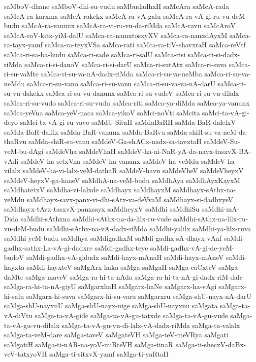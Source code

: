 {saMboV-dhane
saMboV-dhi-su-vudu
saMbudadhxH
saMcAra
saMcA-rada
saMcA-ra-karxma
saMcA-rakekx
saMcA-ra-vA-galu
saMcA-ra-vA-gi-ru-vu-deM-budu
saMcA-ra-vanunx
saMcA-ra-vi-ru-vu-da-riMda
saMcA-ravu
saMcAroV
saMcA-roV-kitx-yiM-dalU
saMca-ra-namxtosxyXV
saMca-ra-nanxdAyxM
saMca-ra-tayx-yamf
saMca-ra-teyxVSa
saMca-rati
saMca-ra-tiV-shavxraH
saMca-reVtf
saMca-ri-sa-ba-hudu
saMca-ri-sade
saMca-ri-salU
saMca-risi
saMca-ri-si-dadx-riMda
saMca-ri-si-danoV
saMca-ri-si-darU
saMca-ri-sutAtx
saMca-ri-suva
saMca-ri-su-vaMte
saMca-ri-su-va-nA-dadx-riMda
saMca-ri-su-va-neMba
saMca-ri-su-va-neMdu
saMca-ri-su-vano
saMca-ri-su-vanu
saMca-ri-su-va-va-nA-darU
saMca-ri-su-vu-dakekx
saMca-ri-su-vu-danunx
saMca-ri-su-vudeV
saMca-ri-su-vu-dilalx
saMca-ri-su-vudo
saMca-ri-su-vudu
saMca-riti
saMca-ya-diMda
saMca-ya-vanunx
saMca-yeVna
saMca-yeV-naca
saMca-yikoV
saMci-noVti
saMcita
saMci-ta-vA-gi-deyo
saMci-ta-vA-gi-ru-vavo
saMdU-SitaH
saMdaBaRH
saMda-BaR-dalelxV
saMda-BaR-dalilx
saMda-BaR-vanunx
saMda-BaRvu
saMda-shiR-su-va-neM-da-thaRvu
saMda-shiR-su-vanu
saMdeV-Ga-shACx-nadx-sa-tavxtaH
saMdeV-Su-veM-bu-dAgi
saMdeVha
saMdeVhaH
saMdeV-ha-ni-NaR-yA-da-nayx-tasxvX-BA-vAdi
saMdeV-ha-setxVna
saMdeV-ha-vanunx
saMdeV-ha-veMdu
saMdeV-ha-vilalx
saMdeV-ha-vi-lalx-veM-dathaR
saMdeV-havu
saMdeVheV
saMdeVheyxV
saMdeV-heyxV-ga-haneV
saMdhA-na-veM-budu
saMdhAya
saMdhAyxKayxM
saMdhatetxV
saMdha-vi-lalxde
saMdhayx
saMdhayxM
saMdhayx-sAthx-na-veMdu
saMdhayx-savx-panx-vi-dhi-sAtx-va-deVvaM
saMdhayx-si-dadhxyeV
saMdhayx-tAvx-tasxvX-panxsayx
saMdheyxV
saMdhi
saMdhiSu
saMdhi-mA-Dida
saMdhi-sAthxna
saMdhi-sAthx-na-da-lilx-ru-vude
saMdhi-sAthx-na-lilx-ru-vu-deM-budu
saMdhi-sAthx-na-vA-dadx-riMda
saMdhi-yalilx
saMdhi-ya-lilx-ruva
saMdhi-yeM-budu
saMdhya
saMdigadhxM
saMdi-gadhx-sA-dhayx-vAnf
saMdi-gadhx-sathx-La-vA-gi-dadxre
saMdi-gadhx-teye
saMdi-gadhx-vA-gi-de-yeM-budoV
saMdi-gadhx-vA-gidudx
saMdi-hayx-mAnaH
saMdi-hayx-mAneV
saMdi-hayxta
saMdi-hayxteV
saMgArx-haka
saMga
saMgaH
saMga-caCxteV
saMga-daMte
saMga-maveV
saMga-ra-hi-ta-nAda
saMga-ra-hi-ta-nA-gi-dadx-riM-dale
saMga-ra-hi-ta-nA-giyU
saMgarxhaH
saMgarx-haNe
saMgarx-ha-vAgi
saMgarx-hi-salu
saMgarx-hi-suva
saMgarx-hi-su-varu
saMgarxru
saMga-shU-nayx-nA-darU
saMga-shU-nayxnU
saMga-shU-nayx-nige
saMga-shU-nayxnu
saMgata
saMga-ta-vA-diVtu
saMga-ta-vA-gide
saMga-ta-vA-gu-tatxde
saMga-ta-vA-gu-vude
saMga-ta-vA-gu-vu-dilalx
saMga-ta-vA-gu-vu-di-lalx-vA-dadx-riMda
saMga-ta-valalx
saMga-ta-veM-dare
saMga-taveV
saMgateVH
saMga-teV-meVRya
saMgati
saMgatiH
saMga-ti-nAR-na-yoV-miRteVH
saMga-tinaR
saMga-ti-shecxV-daBx-veV-tatxyoVH
saMga-ti-sitxvX-yamf
saMga-ti-yaRtaH
}
